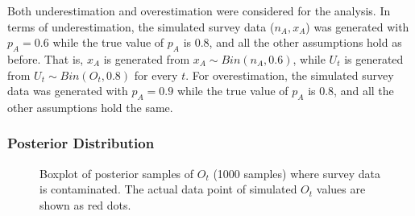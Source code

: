 \documentclass[12pt]{article}
\begin{document}
{Both underestimation and overestimation were considered for the analysis. In terms of underestimation, the simulated survey data ($n_A, x_A$) was generated with $p_A=0.6$ while the true value of $p_A$ is 0.8, and all the other assumptions hold as before. That is, $x_A$ is generated from $x_A \sim Bin(n_A, 0.6)$, while $U_t$ is generated from $U_t \sim Bin(O_t, 0.8)$ for every $t$. For overestimation, the simulated survey data was generated with $p_A=0.9$ while the true value of $p_A$ is 0.8, and all the other assumptions hold the same.  \\

\subsubsection{Posterior Distribution}

\begin{figure}[htb]
	\centering
	\caption[two early result box plots:]{Boxplot of posterior samples of $O_t$ (1000 samples) where survey data is contaminated.  The actual data point of simulated $O_t$ values are shown as red dots.}
	\label{contam_ot}
\end{figure}

}
\end{document}
